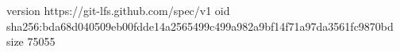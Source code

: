 version https://git-lfs.github.com/spec/v1
oid sha256:bda68d040509eb00fdde14a2565499c499a982a9bf14f71a97da3561fc9870bd
size 75055

